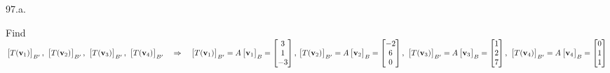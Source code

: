 \documentclass[12pt]{book}
\begin{document}
\begin{CJK}{UTF8}{bsmi}
97.a. \begin{minipage}[t]{\dimexpr\linewidth-2em}
Find $\begin{bmatrix}
T(\textbf{v}_1 )
\end{bmatrix}_{B'},\ \begin{bmatrix}
T(\textbf{v}_2 )
\end{bmatrix}_{B'},\ \begin{bmatrix}
T(\textbf{v}_3 )
\end{bmatrix}_{B'},\ \begin{bmatrix}
T(\textbf{v}_4 )
\end{bmatrix}_{B'}\quad\Rightarrow\quad\begin{bmatrix}
T(\textbf{v}_1 )
\end{bmatrix}_{B'}=A\begin{bmatrix}
\textbf{v}_1
\end{bmatrix}_B=\begin{bmatrix}
3\\1\\-3
\end{bmatrix},\\ \begin{bmatrix}
T(\textbf{v}_2 )
\end{bmatrix}_{B'}=A\begin{bmatrix}
\textbf{v}_2
\end{bmatrix}_B=\begin{bmatrix}
-2\\6\\0
\end{bmatrix},\ \begin{bmatrix}
T(\textbf{v}_3 )
\end{bmatrix}_{B'}=A\begin{bmatrix}
\textbf{v}_3
\end{bmatrix}_B=\begin{bmatrix}
1\\2\\7
\end{bmatrix},\ \begin{bmatrix}
T(\textbf{v}_4 )
\end{bmatrix}_{B'}=A\begin{bmatrix}
\textbf{v}_4
\end{bmatrix}_B=\begin{bmatrix}
0\\1\\1
\end{bmatrix}$
\end{minipage}\\


\end{CJK}
\end{document}
